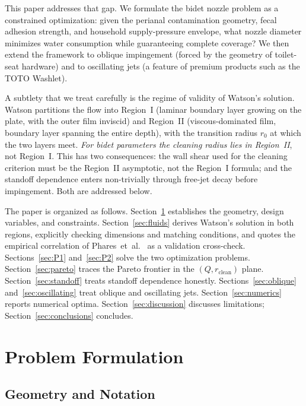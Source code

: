 \documentclass[aps,prfluids,reprint,amsmath,amssymb,floatfix]{revtex4-2}
\begin{document}
This paper addresses that gap. We formulate the bidet nozzle problem as a
constrained optimization: given the perianal contamination geometry, fecal
adhesion strength, and household supply-pressure envelope, what nozzle
diameter minimizes water consumption while guaranteeing complete coverage?
We then extend the framework to oblique impingement (forced by the
geometry of toilet-seat hardware) and to oscillating jets (a feature of
premium products such as the TOTO Washlet).

A subtlety that we treat carefully is the regime of validity of Watson's
solution. Watson partitions the flow into Region~I (laminar boundary
layer growing on the plate, with the outer film inviscid) and Region~II
(viscous-dominated film, boundary layer spanning the entire depth), with
the transition radius $r_0$ at which the two layers meet. \emph{For
bidet parameters the cleaning radius lies in Region~II}, not Region~I.
This has two consequences: the wall shear used for the cleaning criterion
must be the Region~II asymptotic, not the Region~I formula; and the
standoff dependence enters non-trivially through free-jet decay before
impingement. Both are addressed below.

The paper is organized as follows. Section~\ref{sec:problem} establishes
the geometry, design variables, and constraints. Section~\ref{sec:fluids}
derives Watson's solution in both regions, explicitly checking dimensions
and matching conditions, and quotes the empirical correlation of
Phares~et~al.~\citep{Phares2000} as a validation cross-check.
Sections~\ref{sec:P1} and~\ref{sec:P2} solve the two optimization problems.
Section~\ref{sec:pareto} traces the Pareto frontier in the $(Q, r_\mathrm{clean})$
plane. Section~\ref{sec:standoff} treats standoff dependence honestly.
Sections~\ref{sec:oblique} and~\ref{sec:oscillating} treat oblique and
oscillating jets. Section~\ref{sec:numerics} reports numerical optima.
Section~\ref{sec:discussion} discusses limitations; Section~\ref{sec:conclusions}
concludes.

\section{Problem Formulation}
\label{sec:problem}

\subsection{Geometry and Notation}
\end{document}
